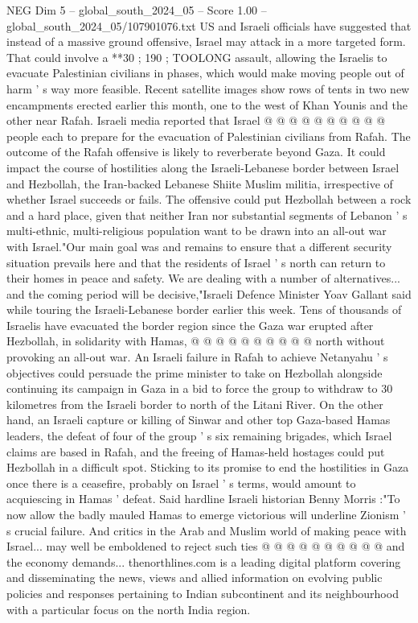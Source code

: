 \begin{textsample}{NEG Dim 5 – global\_south\_2024\_05 – Score 1.00 – global\_south\_2024\_05/107901076.txt}
US and Israeli officials have suggested that instead of a massive ground offensive, Israel may attack in a more targeted form.
That could involve a **30 ; 190 ; TOOLONG assault, allowing the Israelis to evacuate Palestinian civilians in phases, which would make moving people out of harm ' s way more feasible.
Recent satellite images show rows of tents in two new encampments erected earlier this month, one to the west of Khan Younis and the other near Rafah.
Israeli media reported that Israel @ @ @ @ @ @ @ @ @ @ people each to prepare for the evacuation of Palestinian civilians from Rafah.
The outcome of the Rafah offensive is likely to reverberate beyond Gaza.
It could impact the course of hostilities along the Israeli-Lebanese border between Israel and Hezbollah, the Iran-backed Lebanese Shiite Muslim militia, irrespective of whether Israel succeeds or fails.
The offensive could put Hezbollah between a rock and a hard place, given that neither Iran nor substantial segments of Lebanon ' s multi-ethnic, multi-religious population want to be drawn into an all-out war with Israel."Our main goal was and remains to ensure that a different security situation prevails here and that the residents of Israel ' s north can return to their homes in peace and safety.
We are dealing with a number of alternatives... and the coming period will be decisive,"Israeli Defence Minister Yoav Gallant said while touring the Israeli-Lebanese border earlier this week.
Tens of thousands of Israelis have evacuated the border region since the Gaza war erupted after Hezbollah, in solidarity with Hamas, @ @ @ @ @ @ @ @ @ @ north without provoking an all-out war.
An Israeli failure in Rafah to achieve Netanyahu ' s objectives could persuade the prime minister to take on Hezbollah alongside continuing its campaign in Gaza in a bid to force the group to withdraw to 30 kilometres from the Israeli border to north of the Litani River.
On the other hand, an Israeli capture or killing of Sinwar and other top Gaza-based Hamas leaders, the defeat of four of the group ' s six remaining brigades, which Israel claims are based in Rafah, and the freeing of Hamas-held hostages could put Hezbollah in a difficult spot.
Sticking to its promise to end the hostilities in Gaza once there is a ceasefire, probably on Israel ' s terms, would amount to acquiescing in Hamas ' defeat.
Said hardline Israeli historian Benny Morris :"To now allow the badly mauled Hamas to emerge victorious will underline Zionism ' s crucial failure.
And critics in the Arab and Muslim world of making peace with Israel... may well be emboldened to reject such ties @ @ @ @ @ @ @ @ @ @ and the economy demands... thenorthlines.com is a leading digital platform covering and disseminating the news, views and allied information on evolving public policies and responses pertaining to Indian subcontinent and its neighbourhood with a particular focus on the north India region.

\end{textsample}
